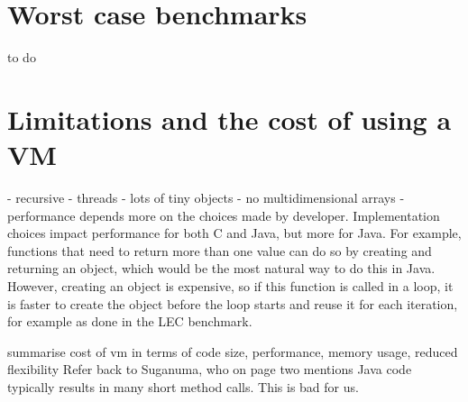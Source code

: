 \section{Worst case benchmarks}
to do




\section{Limitations and the cost of using a VM}
 - recursive
 - threads
 - lots of tiny objects
 - no multidimensional arrays
 - performance depends more on the choices made by developer. Implementation choices impact performance for both C and Java, but more for Java. For example, functions that need to return more than one value can do so by creating and returning an object, which would be the most natural way to do this in Java. However, creating an object is expensive, so if this function is called in a loop, it is faster to create the object before the loop starts and reuse it for each iteration, for example as done in the LEC benchmark.


summarise cost of vm in terms of code size, performance, memory usage, reduced flexibility
Refer back to Suganuma, who on page two mentions Java code typically results in many short method calls. This is bad for us.
